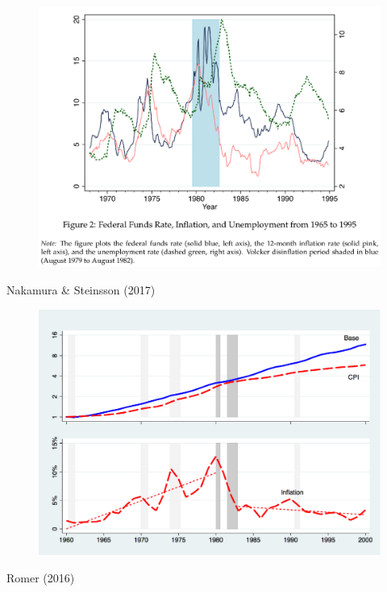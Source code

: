 \documentclass{beamer}
\begin{document}
\begin{frame}
  \begin{figure}
    \includegraphics[scale=.6]{nakamura_steinsson.eps}
  \end{figure}
  Nakamura \& Steinsson (2017)
\end{frame}

\begin{frame}
  \begin{figure}
    \includegraphics[scale=.7]{romer.eps}
  \end{figure}
  Romer (2016)
\end{frame}
\end{document}
